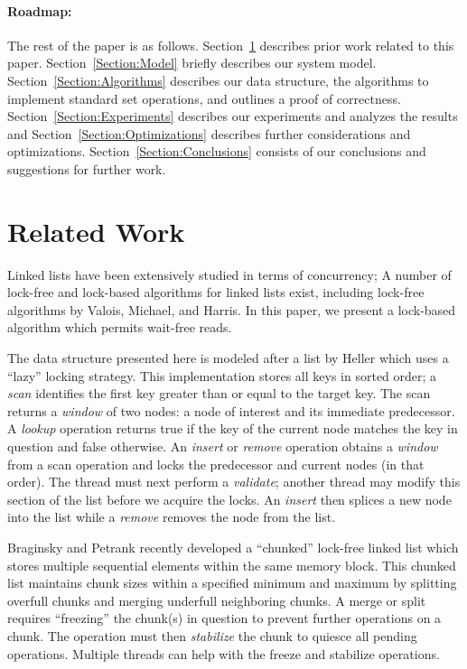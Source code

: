 \documentclass{llncs}
\begin{document}
\paragraph{Roadmap:} The rest of the paper is as follows.  Section~\ref{Section:Related} describes prior work related to this paper.  Section~\ref{Section:Model} briefly describes our system model.  Section~\ref{Section:Algorithms} describes our data structure, the algorithms to implement standard set operations, and outlines a proof of correctness.  Section~\ref{Section:Experiments} describes our experiments and
analyzes the results and Section~\ref{Section:Optimizations} describes further considerations and optimizations.  Section~\ref{Section:Conclusions} consists of our conclusions and suggestions for further work.

\section{Related Work}\label{Section:Related}
Linked lists have been extensively studied in terms of concurrency;
A number of lock-free and lock-based algorithms
for linked lists exist, including lock-free algorithms by
Valois{\cite{Valois:LFLists}}, Michael{\cite{Michael:LFListSets}}, and 
Harris{\cite{Harris:PragmaticLists}}.
In this paper, we present a lock-based algorithm which permits wait-free reads.

The data structure presented here is modeled after a list by Heller which uses
a ``lazy'' locking strategy\cite{Heller:LazyList}.  This implementation
stores all keys in sorted order; a {\em scan}
identifies the first key greater than or equal to the target key.  The
scan returns a {\em window} of two nodes: a node of interest
and its immediate predecessor.  A {\em lookup} operation returns {\sc true} if
the key of the current node matches the key in question and {\sc false} otherwise.
An {\em insert} or {\em remove} operation obtains a {\em window} from a scan
operation and locks the predecessor and current nodes
(in that order).  The thread must next perform a {\em validate}; another thread may
modify this section of the list before we acquire the locks.  
An {\em insert} then splices a new node into the
list while a {\em remove} removes the node from the list.

Braginsky and Petrank recently developed a ``chunked'' lock-free linked list\cite{Braginsky}
which stores multiple sequential elements within the same memory block.  This chunked list
maintains chunk sizes within a specified minimum and maximum by splitting overfull chunks
and merging underfull neighboring chunks.  A merge or split requires 
``freezing'' the chunk(s) in question to prevent further operations on 
a chunk.  The operation must then {\em stabilize} the chunk to quiesce all pending operations.  
Multiple threads can help with the freeze and stabilize operations.
\end{document}
